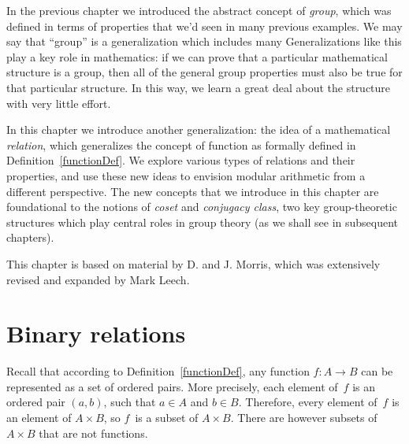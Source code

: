 


\medskip\noindent

In the previous chapter we introduced the abstract concept of \emph{group}, which was defined in terms of properties that we'd seen in many previous examples. We may say that ``group'' is a generalization which includes many Generalizations like this play a key role in mathematics: if we can prove that a particular  mathematical structure is a group, then all  of the general group properties must also be true for that particular structure. In this way, we learn a great deal about the structure with very little effort.

In this chapter we introduce another generalization:  the idea of a mathematical \emph{relation}, which generalizes the concept of function as formally defined in Definition~\ref{functionDef}. We explore various types of relations and their properties, and use these new ideas to envision modular arithmetic from a different perspective. The new concepts that we introduce in this chapter are foundational to the notions of \emph{coset} and \emph{conjugacy  class}, two key group-theoretic structures which play central roles in group theory (as we shall see in subsequent chapters).
\medskip

This chapter  is based on material by  D. and J. Morris, which was extensively revised and expanded by Mark Leech.

\section{Binary relations \quad
{}} 
\label{sec:EquivalenceRelations:BinaryRelation}

Recall that according to Definition~\ref{functionDef}, any function $f \colon A \to B$ can be represented as a set of ordered pairs. More precisely, each element of~$f$ is an ordered pair $(a,b)$, such that $a \in A$ and $b \in B$. Therefore, every element of~$f$ is an element of $A \times B$, so $f$~is a subset of $A \times B$.
There are however subsets of $A \times B$ that are not functions.


